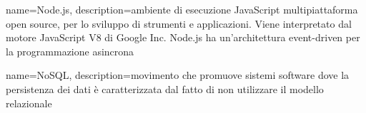 

{
	name=Node.js,
	description={ambiente di esecuzione JavaScript multipiattaforma open source, per lo sviluppo di strumenti e applicazioni. Viene interpretato dal motore JavaScript V8 di Google Inc. Node.js ha un'architettura event-driven per la programmazione asincrona}
}

{
	name=NoSQL,
	description={movimento che promuove sistemi software dove la persistenza dei dati è caratterizzata dal fatto di non utilizzare il modello relazionale}
}